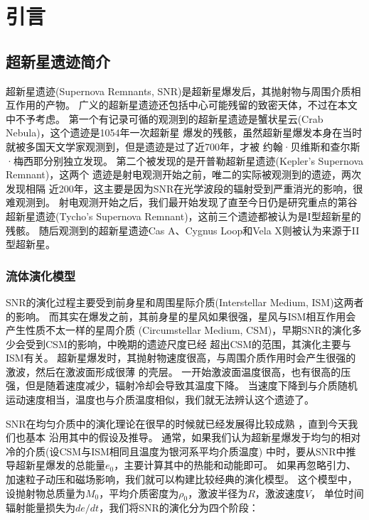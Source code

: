 \chapter{引言}
\label{Intro}

\section{超新星遗迹简介}
\label{SNRintro}
超新星遗迹(Supernova Remnants, SNR)是超新星爆发后，其抛射物与周围介质相互作用的产物。
广义的超新星遗迹还包括中心可能残留的致密天体，不过在本文中不予考虑。
第一个有记录可循的观测到的超新星遗迹是蟹状星云(Crab Nebula)，这个遗迹是1054年一次超新星
爆发的残骸，虽然超新星爆发本身在当时就被多国天文学家观测到，但是遗迹是过了近700年，才被
约翰·贝维斯和查尔斯·梅西耶分别独立发现\citep{barrow2011cosmic}。
第二个被发现的是开普勒超新星遗迹(Kepler's Supernova Remnant)\citep{Baade1943}，这两个
遗迹是射电观测开始之前，唯二的实际被观测到的遗迹\citep{Minkowski1964}，两次发现相隔
近200年，这主要是因为SNR在光学波段的辐射受到严重消光的影响，很难观测到。
射电观测开始之后，我们最开始发现了直至今日仍是研究重点的第谷超新星遗迹(Tycho's
Supernova Remnant)，这前三个遗迹都被认为是I型超新星的残骸。
随后观测到的超新星遗迹Cas A、Cygnus Loop和Vela X则被认为来源于II型超新星。

\subsection{流体演化模型}

SNR的演化过程主要受到前身星和周围星际介质(Interstellar Medium, ISM)这两者的影响。
而其实在爆发之前，其前身星的星风如果很强，星风与ISM相互作用会产生性质不太一样的星周介质
(Circumstellar Medium, CSM)，早期SNR的演化多少会受到CSM的影响，中晚期的遗迹尺度已经
超出CSM的范围，其演化主要与ISM有关。
超新星爆发时，其抛射物速度很高，与周围介质作用时会产生很强的激波，然后在激波面形成很薄
的壳层。
一开始激波面温度很高，也有很高的压强，但是随着速度减少，辐射冷却会导致其温度下降。
当速度下降到与介质随机运动速度相当，温度也与介质温度相似，我们就无法辨认这个遗迹了。

SNR在均匀介质中的演化理论在很早的时候就已经发展得比较成熟
\citep{1959sdmm.book.....S, 1970IAUS...39..229W, Woltjer1972}，直到今天我们也基本
沿用其中的假设及推导。
通常，如果我们认为超新星爆发于均匀的相对冷的介质(设CSM与ISM相同且温度为银河系平均介质温度)
中时，要从SNR中推导超新星爆发的总能量$e_0$，主要计算其中的热能和动能即可。
如果再忽略引力、加速粒子动压和磁场影响，我们就可以构建比较经典的演化模型。
这个模型中，设抛射物总质量为$M_0$，平均介质密度为$\rho_0$，激波半径为$R$，激波速度$V$，
单位时间辐射能量损失为$de/dt$，我们将SNR的演化分为四个阶段：

